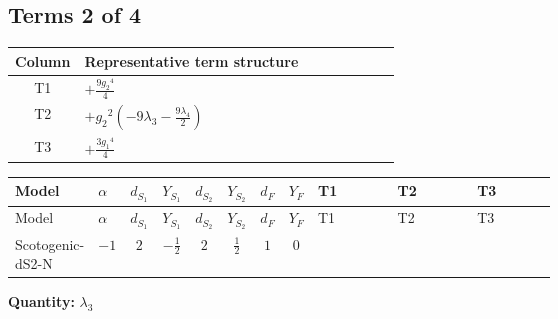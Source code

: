 \documentclass[8pt]{article}
\begin{document}
\begin{landscape}
\subsection*{Terms 2 of 4}
\begin{center}
\begin{tabular}{@{}c >{\raggedright\arraybackslash}p{0.82\linewidth}@{}}
\toprule
Column & Representative term structure \\
\midrule
T1 & \(\displaystyle +\frac{9 {g_2}^4}{4}\) \\
\midrule
T2 & \(\displaystyle +{g_2}^2 \left(-9 {\lambda_3}-\frac{9 {\lambda_4}}{2}\right)\) \\
\midrule
T3 & \(\displaystyle +\frac{3 {g_1}^4}{4}\) \\
\midrule
\bottomrule
\end{tabular}
\end{center}
\smallskip
\tiny
\begin{longtable}{@{}llcccccc >{\raggedright\arraybackslash}p{0.21\linewidth} >{\raggedright\arraybackslash}p{0.21\linewidth} >{\raggedright\arraybackslash}p{0.21\linewidth}@{}}
\toprule
Model & $\alpha$ & $d_{S_1}$ & $Y_{S_1}$ & $d_{S_2}$ & $Y_{S_2}$ & $d_F$ & $Y_F$ & T1 & T2 & T3 \\
\midrule
\endfirsthead
\toprule
Model & $\alpha$ & $d_{S_1}$ & $Y_{S_1}$ & $d_{S_2}$ & $Y_{S_2}$ & $d_F$ & $Y_F$ & T1 & T2 & T3 \\
\midrule
\endhead
Scotogenic-dS2-N & $-1$ & $2$ & $-\frac{1}{2}$ & $2$ & $\frac{1}{2}$ & $1$ & $0$ & \scriptsize\adjustbox{max width=\linewidth}{$\begin{gathered} +\frac{9 {g_2}^4}{4}\end{gathered}$} & \scriptsize\adjustbox{max width=\linewidth}{$\begin{gathered} +{g_2}^2 \left(-9 {\lambda_3}-\frac{9 {\lambda_4}}{2}\right)\end{gathered}$} & \scriptsize\adjustbox{max width=\linewidth}{$\begin{gathered} +\frac{3 {g_1}^4}{4}\end{gathered}$} \\
\midrule
\bottomrule
\end{longtable}
\clearpage
\noindent\textbf{Quantity: }$\lambda_3$\par\smallskip

\end{landscape}
\end{document}
